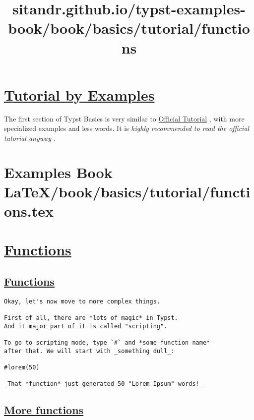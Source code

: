 \section{\texorpdfstring{\hyperref[tutorial-by-examples]{Tutorial by
Examples}}{Tutorial by Examples}}\label{tutorial-by-examples}

The first section of Typst Basics is very similar to
\href{https://typst.app/docs/tutorial/}{Official Tutorial} , with more
specialized examples and less words. It is \emph{highly recommended to
read the official tutorial anyway} .


\section{Examples Book LaTeX/book/basics/tutorial/functions.tex}
\title{sitandr.github.io/typst-examples-book/book/basics/tutorial/functions}

\section{\texorpdfstring{\hyperref[functions]{Functions}}{Functions}}\label{functions}

\subsection{\texorpdfstring{\hyperref[functions-1]{Functions}}{Functions}}\label{functions-1}

\begin{verbatim}
Okay, let's now move to more complex things.

First of all, there are *lots of magic* in Typst.
And it major part of it is called "scripting".

To go to scripting mode, type `#` and *some function name*
after that. We will start with _something dull_:

#lorem(50)

_That *function* just generated 50 "Lorem Ipsum" words!_
\end{verbatim}

\pandocbounded{}

\subsection{\texorpdfstring{\hyperref[more-functions]{More
functions}}{More functions}}\label{more-functions}

